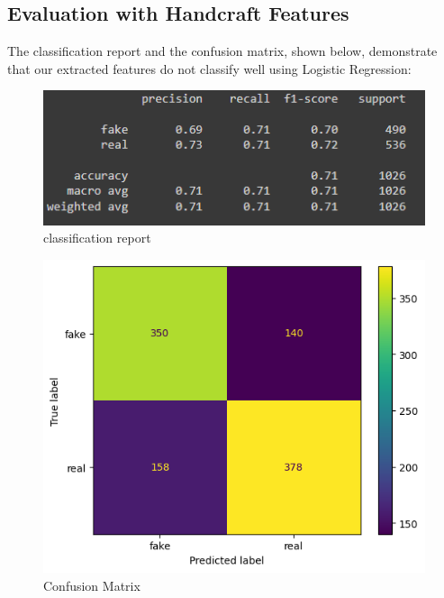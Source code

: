 \documentclass{template}
\begin{document}
\subsection{Evaluation with Handcraft Features}
The classification report and the confusion matrix, shown below, demonstrate that our extracted features do not classify well using Logistic Regression:
\begin{figure}
\includegraphics[scale=0.9]{LR3.png}
\caption{classification report}
\label{fig:logo}
\end{figure}
\begin{figure}
\includegraphics[scale=0.9]{LR4.png}
\caption{Confusion Matrix}
\label{fig:logo}
\end{figure}
\end{document}

